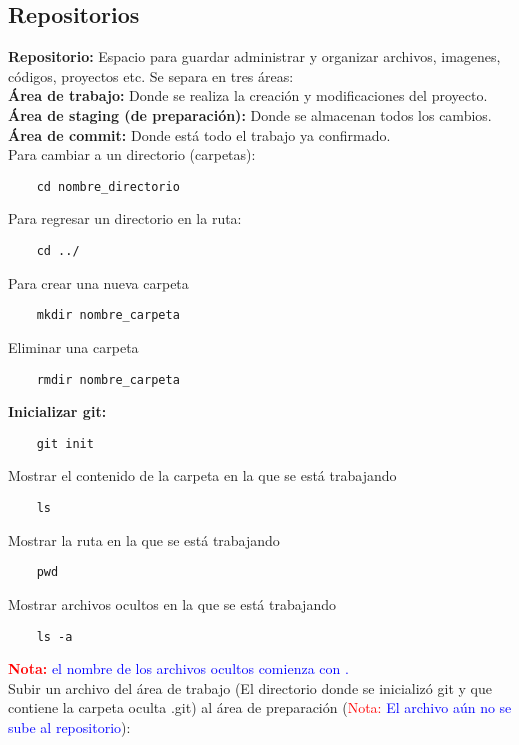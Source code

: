\documentclass[10pt,oneside]{article}
\begin{document}
\begin{multicols}{2}
\section{Repositorios}
\textbf{Repositorio:} Espacio para guardar administrar y organizar archivos, imagenes, códigos, proyectos etc. Se separa en tres áreas:\\ \newline \textbf{Área de trabajo:} Donde se realiza la creación y modificaciones del proyecto.\\ \newline \textbf{Área de staging (de preparación):} Donde se almacenan todos los cambios. 
\\ \newline \textbf{Área de commit:} Donde está todo el trabajo ya confirmado.\\ \newline 
Para cambiar a un directorio (carpetas): \begin{verbatim}
    cd nombre_directorio
\end{verbatim}
Para regresar un directorio en la ruta: 
\begin{verbatim}
    cd ../
\end{verbatim}
Para crear una nueva carpeta 
\begin{verbatim}
    mkdir nombre_carpeta
\end{verbatim}
Eliminar una carpeta 
\begin{verbatim}
    rmdir nombre_carpeta
\end{verbatim}
\textbf{Inicializar git:}
\begin{verbatim}
    git init
\end{verbatim}
Mostrar el contenido de la carpeta en la que se está trabajando
\begin{verbatim}
    ls
\end{verbatim}
Mostrar la ruta en la que se está trabajando
\begin{verbatim}
    pwd
\end{verbatim}
Mostrar archivos ocultos en la que se está trabajando
\begin{verbatim}
    ls -a
\end{verbatim}
\textbf{\textcolor{red}{Nota:}} \textcolor{blue}{el nombre de los archivos ocultos comienza con .}\\ \newline
Subir un archivo del área de trabajo (El directorio donde se inicializó git y que contiene la carpeta oculta .git) al área de preparación (\textcolor{red}{Nota:}\textcolor{blue}{ El archivo aún no se sube al repositorio}):

\end{multicols}
\end{document}
